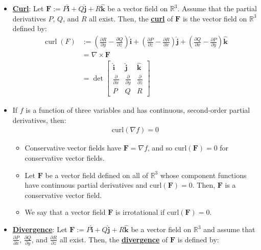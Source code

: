 \documentclass[11pt]{article}
\newcommand{\dfn}[1]{\underline{\textbf{#1}}}
\newcommand{\R}[0]{\mathbb{R}}
\begin{document}
\begin{itemize}[noitemsep]
	\item \dfn{Curl}: Let $\mathbf{F} := P \hat{\mathbf{i}} + Q \hat{\mathbf{j}} + R \hat{\mathbf{k}}$ be a vector field on $\R^3$. Assume that the partial derivatives $P$, $Q$, and $R$ all exist. Then, the \dfn{curl} of $\mathbf{F}$ is the vector field on $\R^3$ defined by: 
	\begin{align*}
		\operatorname{curl}(F) & := \left( \frac{\partial R}{\partial y} - \frac{\partial Q}{\partial z}   \right) \hat{\mathbf{i}} + \left( \frac{\partial P}{\partial z} - \frac{\partial R}{\partial x} \right) \hat{\mathbf{j}} + \left( \frac{\partial Q}{\partial x} - \frac{\partial P}{\partial y} \right) \hat{\mathbf{k}} \\
		& = \nabla \times \mathbf{F} \\
		& = \det \begin{bmatrix}
			\hat{\mathbf{i}} & \hat{\mathbf{j}} & \hat{\mathbf{k}} \\
			\frac{\partial}{\partial x} & \frac{\partial }{\partial y} & \frac{\partial }{\partial z} \\
			P & Q & R
		\end{bmatrix}
	\end{align*}
	\item If $f$ is a function of three variables and has continuous, second-order partial derivatives, then:
	\begin{align}
		\text{curl}(\nabla f) = 0 	
	\end{align}
	\begin{itemize}[noitemsep]
		\item Conservative vector fields have $\mathbf{F} = \nabla f$, and so $\text{curl}(\mathbf{F}) = 0$ for conservative vector fields.
		\item Let $\mathbf{F}$ be a vector field defined on all of $\R^3$ whose component functions have continuous partial derivatives and $\text{curl}(\mathbf{F}) = 0$. Then, $\mathbf{F}$ is a conservative vector field. 
		\item We say that a vector field $\mathbf{F}$ is irrotational if $\text{curl}(\mathbf{F})=0$.
	\end{itemize}
	\item \dfn{Divergence}: Let $\mathbf{F} := P \hat{\mathbf{i}} + Q \hat{\mathbf{j}} + R \hat{\mathbf{k}}$ be a vector field on $\R^3$ and assume that $\frac{\partial P}{\partial x }$, $\frac{\partial Q}{\partial y}$, and $\frac{\partial R}{\partial z}$ all exist. Then, the \dfn{divergence} of $\mathbf{F}$ is defined by:

\end{itemize}
\end{document}
